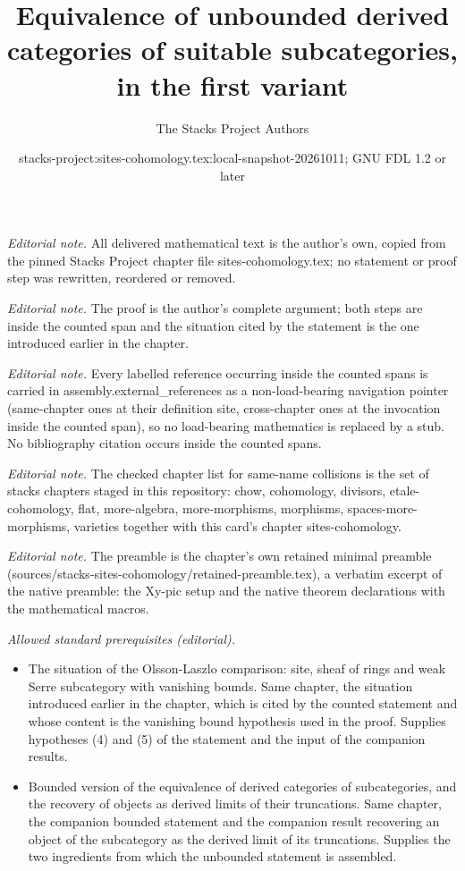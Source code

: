 \documentclass[10pt,a4paper]{amsart}
\title{Equivalence of unbounded derived categories of suitable subcategories, in the first variant}
\author{The Stacks Project Authors}
\date{stacks-project:sites-cohomology.tex:local-snapshot-20261011; GNU FDL 1.2 or later}
\theoremstyle{plain}
\theoremstyle{definition}
\theoremstyle{remark}
\numberwithin{equation}{subsection}
\begin{document}
\maketitle
\noindent\textit{Editorial note.} All delivered mathematical text is the author's own, copied from the pinned Stacks Project chapter file sites-cohomology.tex; no statement or proof step was rewritten, reordered or removed.\par\medskip
\noindent\textit{Editorial note.} The proof is the author's complete argument; both steps are inside the counted span and the situation cited by the statement is the one introduced earlier in the chapter.\par\medskip
\noindent\textit{Editorial note.} Every labelled reference occurring inside the counted spans is carried in assembly.external\_references as a non-load-bearing navigation pointer (same-chapter ones at their definition site, cross-chapter ones at the invocation inside the counted span), so no load-bearing mathematics is replaced by a stub. No bibliography citation occurs inside the counted spans.\par\medskip
\noindent\textit{Editorial note.} The checked chapter list for same-name collisions is the set of stacks chapters staged in this repository: chow, cohomology, divisors, etale-cohomology, flat, more-algebra, more-morphisms, morphisms, spaces-more-morphisms, varieties together with this card's chapter sites-cohomology.\par\medskip
\noindent\textit{Editorial note.} The preamble is the chapter's own retained minimal preamble (sources/stacks-sites-cohomology/retained-preamble.tex), a verbatim excerpt of the native preamble: the Xy-pic setup and the native theorem declarations with the mathematical macros.\par\medskip
\noindent\textit{Allowed standard prerequisites (editorial).}\begin{itemize}
\item The situation of the Olsson-Laszlo comparison: site, sheaf of rings and weak Serre subcategory with vanishing bounds. Same chapter, the situation introduced earlier in the chapter, which is cited by the counted statement and whose content is the vanishing bound hypothesis used in the proof. Supplies hypotheses (4) and (5) of the statement and the input of the companion results.
\item Bounded version of the equivalence of derived categories of subcategories, and the recovery of objects as derived limits of their truncations. Same chapter, the companion bounded statement and the companion result recovering an object of the subcategory as the derived limit of its truncations. Supplies the two ingredients from which the unbounded statement is assembled.
\end{itemize}\medskip
\end{document}
